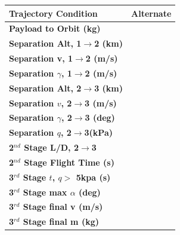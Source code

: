 \begin{table}
	\centering
\begin{tabular}{l c} 
	\hline \textbf{Trajectory Condition}
	& Alternate
	\\
	\hline \textbf{Payload to Orbit (kg)}
	& \PayloadToOrbitAlternate
	\\
	\textbf{Separation Alt, 1$\rightarrow$2 (km)}
	& \firstsecondSeparationAltAlternate
	\\
	\textbf{Separation v, 1$\rightarrow$2 (m/s)}
	& \firstsecondSeparationvAlternate
	\\
	\textbf{Separation $\gamma$, 1$\rightarrow$2 (m/s)}
	& \firstsecondSeparationgammaAlternate
	\\
	\textbf{Separation Alt, 2$\rightarrow$3 (km)}
	& \secondthirdSeparationAltAlternate
	\\
	\textbf{Separation $v$, 2$\rightarrow$3 (m/s)}
	& \secondthirdSeparationvAlternate
	\\
	\textbf{Separation $\gamma$, 2$\rightarrow$3 (deg)}
	& \secondthirdSeparationgammaAlternate
	\\
	\textbf{Separation $q$, 2$\rightarrow$3(kPa)}
	& \secondthirdSeparationqAlternate
	\\
	\textbf{2$^{nd}$ Stage L/D, 2$\rightarrow$3}
	& \secondthirdSeparationLDAlternate
	\\
	\textbf{2$^{nd}$ Stage Flight Time (s)}
	& \secondFlightTimeAlternate
	\\
	\textbf{3$^{rd}$ Stage $t$, $q >$ 5kpa (s)}
	& \thirdqOverFiveAlternate
	\\
	\textbf{3$^{rd}$ Stage max $\alpha$ (deg)}
	& \thirdmaxAoAAlternate
	\\
	\textbf{3$^{rd}$ Stage final v (m/s)}
	& \thirdcircvAlternate
	\\
	\textbf{3$^{rd}$ Stage final m (kg)}
	& \thirdcircmAlternate
	\\
	\hline 
\end{tabular} 
\end{table}

